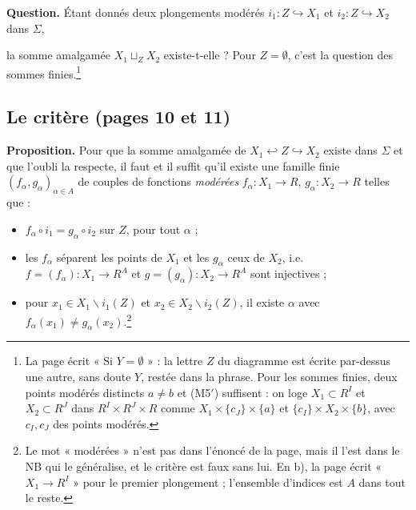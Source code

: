 \documentclass[11pt,a4paper]{article}
\begin{document}
\textbf{Question.} Étant donnés deux plongements modérés $i_1 : Z
\hookrightarrow X_1$ et $i_2 : Z \hookrightarrow X_2$ dans $\Sigma$,


la somme amalgamée $X_1 \sqcup_Z X_2$ existe-t-elle ? Pour $Z = \emptyset$,
c'est la question des sommes finies.\footnote{La page écrit « Si $Y =
\emptyset$ » : la lettre $Z$ du diagramme est écrite par-dessus une autre,
sans doute $Y$, restée dans la phrase. Pour les sommes finies, deux points
modérés distincts $a \neq b$ et (M5$'$) suffisent : on loge $X_1 \subset R^I$
et $X_2 \subset R^J$ dans $R^I \times R^J \times R$ comme $X_1 \times \{c_J\}
\times \{a\}$ et $\{c_I\} \times X_2 \times \{b\}$, avec $c_I, c_J$ des points
modérés.}

\subsection*{Le critère (pages 10 et 11)}

\textbf{Proposition.} Pour que la somme amalgamée de $X_1 \hookleftarrow Z
\hookrightarrow X_2$ existe dans $\Sigma$ et que l'oubli la respecte, il faut
et il suffit qu'il existe une famille finie $(f_\alpha, g_\alpha)_{\alpha \in
A}$ de couples de fonctions \emph{modérées} $f_\alpha : X_1 \to R$, $g_\alpha
: X_2 \to R$ telles que :

\begin{itemize}
\item[a)] $f_\alpha \circ i_1 = g_\alpha \circ i_2$ sur $Z$, pour tout $\alpha$ ;
\item[b)] les $f_\alpha$ séparent les points de $X_1$ et les $g_\alpha$ ceux de
  $X_2$, i.e.\ $f = (f_\alpha) : X_1 \to R^A$ et $g = (g_\alpha) : X_2 \to
  R^A$ sont injectives ;
\item[c)] pour $x_1 \in X_1 \smallsetminus i_1(Z)$ et $x_2 \in X_2 \smallsetminus
  i_2(Z)$, il existe $\alpha$ avec $f_\alpha(x_1) \neq g_\alpha(x_2)$.\footnote{Le mot « modérées » n'est pas dans l'énoncé de la page, mais il l'est
dans le NB qui le généralise, et le critère est faux sans lui. En b), la page
écrit « $X_1 \to R^I$ » pour le premier plongement ; l'ensemble d'indices est
$A$ dans tout le reste.}
\end{itemize}
\end{document}
